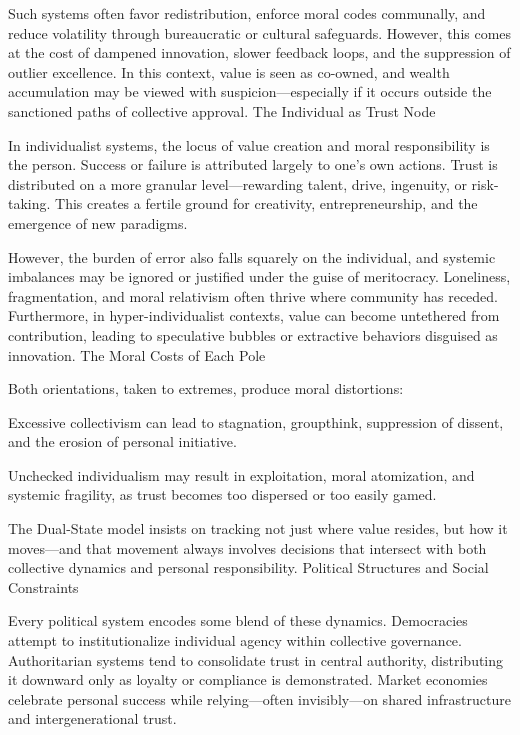 \documentclass[11pt,oneside]{book}
\begin{document}
Such systems often favor redistribution, enforce moral codes communally, and reduce volatility through bureaucratic or cultural safeguards. However, this comes at the cost of dampened innovation, slower feedback loops, and the suppression of outlier excellence. In this context, value is seen as co-owned, and wealth accumulation may be viewed with suspicion—especially if it occurs outside the sanctioned paths of collective approval.
The Individual as Trust Node

In individualist systems, the locus of value creation and moral responsibility is the person. Success or failure is attributed largely to one’s own actions. Trust is distributed on a more granular level—rewarding talent, drive, ingenuity, or risk-taking. This creates a fertile ground for creativity, entrepreneurship, and the emergence of new paradigms.

However, the burden of error also falls squarely on the individual, and systemic imbalances may be ignored or justified under the guise of meritocracy. Loneliness, fragmentation, and moral relativism often thrive where community has receded. Furthermore, in hyper-individualist contexts, value can become untethered from contribution, leading to speculative bubbles or extractive behaviors disguised as innovation.
The Moral Costs of Each Pole

Both orientations, taken to extremes, produce moral distortions:

    Excessive collectivism can lead to stagnation, groupthink, suppression of dissent, and the erosion of personal initiative.

    Unchecked individualism may result in exploitation, moral atomization, and systemic fragility, as trust becomes too dispersed or too easily gamed.

The Dual-State model insists on tracking not just where value resides, but how it moves—and that movement always involves decisions that intersect with both collective dynamics and personal responsibility.
Political Structures and Social Constraints

Every political system encodes some blend of these dynamics. Democracies attempt to institutionalize individual agency within collective governance. Authoritarian systems tend to consolidate trust in central authority, distributing it downward only as loyalty or compliance is demonstrated. Market economies celebrate personal success while relying—often invisibly—on shared infrastructure and intergenerational trust.
\end{document}
